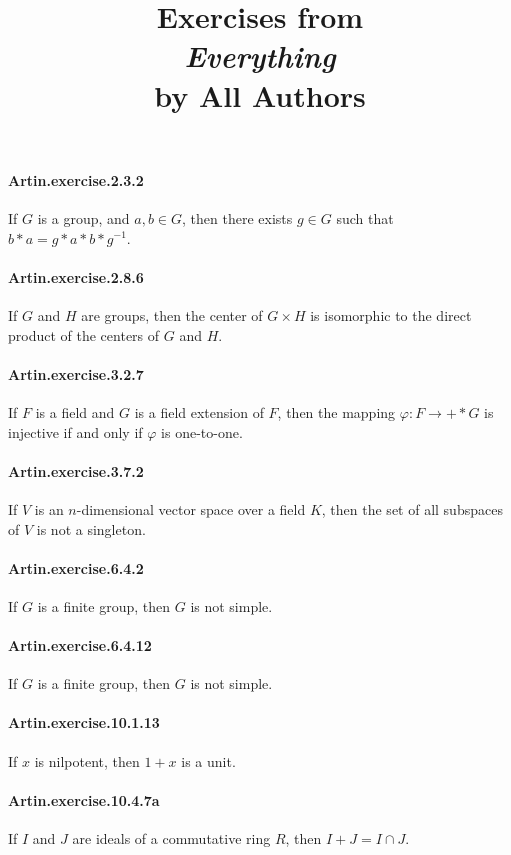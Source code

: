 \documentclass{article}
\title{\textbf{
Exercises from \\
\textit{Everything} \\
by All Authors
}}
\date{}
\begin{document}
\maketitle

\paragraph{Artin.exercise.2.3.2} If $G$ is a group, and $a, b \in G$, then there exists $g \in G$ such that $b*a = g*a*b*g^{-1}$.

\paragraph{Artin.exercise.2.8.6} If $G$ and $H$ are groups, then the center of $G \times H$ is isomorphic to the direct product of the centers of $G$ and $H$.

\paragraph{Artin.exercise.3.2.7} If $F$ is a field and $G$ is a field extension of $F$, then the mapping $φ : F →+* G$ is injective if and only if $φ$ is one-to-one.

\paragraph{Artin.exercise.3.7.2} If $V$ is an $n$-dimensional vector space over a field $K$, then the set of all subspaces of $V$ is not a singleton.

\paragraph{Artin.exercise.6.4.2} If $G$ is a finite group, then $G$ is not simple.

\paragraph{Artin.exercise.6.4.12} If $G$ is a finite group, then $G$ is not simple.

\paragraph{Artin.exercise.10.1.13} If $x$ is nilpotent, then $1 + x$ is a unit.

\paragraph{Artin.exercise.10.4.7a} If $I$ and $J$ are ideals of a commutative ring $R$, then $I + J = I \cap J$.
\end{document}
